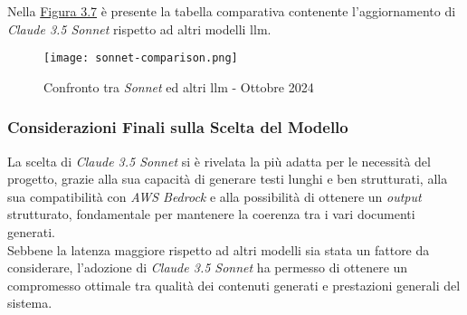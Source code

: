 \noindent Nella {\hyperref[fig:sonnet-comparison]{Figura 3.7}} è presente la tabella comparativa contenente l'aggiornamento di \textit{Claude 3.5 Sonnet} rispetto ad altri modelli \gls{llm}.

\begin{figure}[H]
    \centering
    \texttt{[image: sonnet-comparison.png]}
    \caption{Confronto tra \textit{Sonnet} ed altri \gls{llm} - Ottobre 2024}
    \cite{site:updated-sonnet}
    \label{fig:sonnet-comparison}
\end{figure}



\subsubsection{Considerazioni Finali sulla Scelta del Modello}

La scelta di \textit{Claude 3.5 Sonnet} si è rivelata la più adatta per le necessità del progetto, grazie alla sua capacità di generare testi lunghi e ben strutturati, alla sua compatibilità con \textit{AWS Bedrock} e alla possibilità di ottenere un \textit{output} strutturato, fondamentale per mantenere la coerenza tra i vari documenti generati. \\
Sebbene la latenza maggiore rispetto ad altri modelli sia stata un fattore da considerare, l'adozione di \textit{Claude 3.5 Sonnet} ha permesso di ottenere un compromesso ottimale tra qualità dei contenuti generati e prestazioni generali del sistema.
